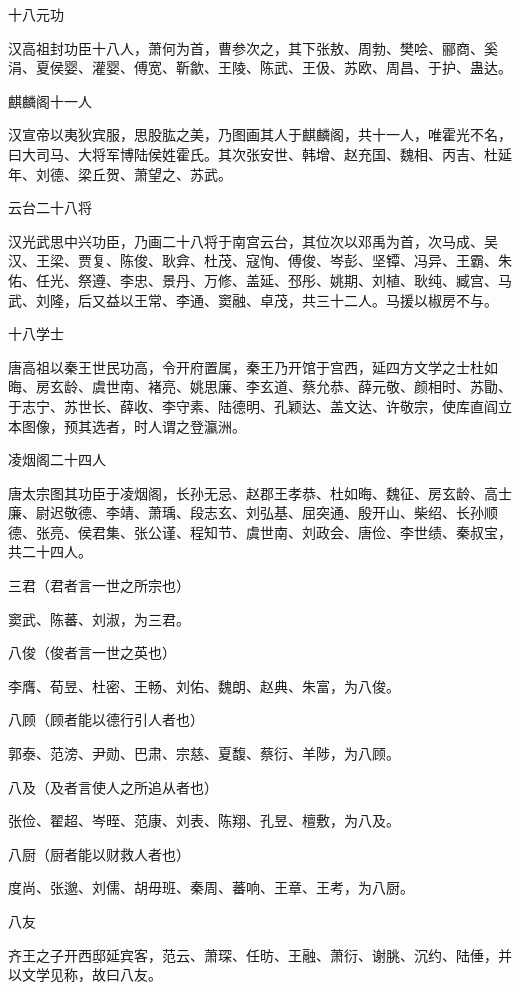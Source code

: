 \documentclass[a4paper,12pt,UTF8,twoside]{ctexbook}
\begin{document}
    十八元功
    
    汉高祖封功臣十八人，萧何为首，曹参次之，其下张敖、周勃、樊哙、郦商、奚涓、夏侯婴、灌婴、傅宽、靳歙、王陵、陈武、王伋、苏欧、周昌、于护、蛊达。
    
    麒麟阁十一人
    
    汉宣帝以夷狄宾服，思股肱之美，乃图画其人于麒麟阁，共十一人，唯霍光不名，曰大司马、大将军博陆侯姓霍氏。其次张安世、韩增、赵充国、魏相、丙吉、杜延年、刘德、梁丘贺、萧望之、苏武。
    
    云台二十八将
    
    汉光武思中兴功臣，乃画二十八将于南宫云台，其位次以邓禹为首，次马成、吴汉、王梁、贾复、陈俊、耿弇、杜茂、寇恂、傅俊、岑彭、坚镡、冯异、王霸、朱佑、任光、祭遵、李忠、景丹、万修、盖延、邳彤、姚期、刘植、耿纯、臧宫、马武、刘隆，后又益以王常、李通、窦融、卓茂，共三十二人。马援以椒房不与。
    
    十八学士
    
    唐高祖以秦王世民功高，令开府置属，秦王乃开馆于宫西，延四方文学之士杜如晦、房玄龄、虞世南、褚亮、姚思廉、李玄道、蔡允恭、薛元敬、颜相时、苏勖、于志宁、苏世长、薛收、李守素、陆德明、孔颖达、盖文达、许敬宗，使库直阎立本图像，预其选者，时人谓之登瀛洲。
    
    凌烟阁二十四人
    
    唐太宗图其功臣于凌烟阁，长孙无忌、赵郡王孝恭、杜如晦、魏征、房玄龄、高士廉、尉迟敬德、李靖、萧瑀、段志玄、刘弘基、屈突通、殷开山、柴绍、长孙顺德、张亮、侯君集、张公谨、程知节、虞世南、刘政会、唐俭、李世绩、秦叔宝，共二十四人。
    
    三君（君者言一世之所宗也）
    
    窦武、陈蕃、刘淑，为三君。
    
    八俊（俊者言一世之英也）
    
    李膺、荀昱、杜密、王畅、刘佑、魏朗、赵典、朱富，为八俊。
    
    八顾（顾者能以德行引人者也）
    
    郭泰、范滂、尹勋、巴肃、宗慈、夏馥、蔡衍、羊陟，为八顾。
    
    八及（及者言使人之所追从者也）
    
    张俭、翟超、岑晊、范康、刘表、陈翔、孔昱、檀敷，为八及。
    
    八厨（厨者能以财救人者也）
    
    度尚、张邈、刘儒、胡毋班、秦周、蕃响、王章、王考，为八厨。
    
    八友
    
    齐王之子开西邸延宾客，范云、萧琛、任昉、王融、萧衍、谢朓、沉约、陆倕，并以文学见称，故曰八友。
    
\end{document}
